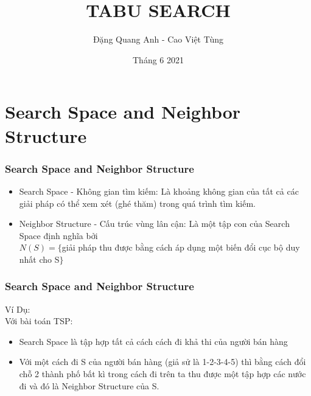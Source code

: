 \documentclass[12pt]{beamer}
\begin{document}
	\author{Đặng Quang Anh - Cao Việt Tùng}
	\title{TABU SEARCH}
	\date{Tháng 6 2021}
	\maketitle
	

	\section{Search Space and Neighbor Structure}
	\begin{frame}
		\frametitle{Search Space and Neighbor Structure}
		\begin{itemize}
			\item Search Space - Không gian tìm kiếm: Là khoảng không gian của tất cả các giải pháp có thể xem xét (ghé thăm) trong quá trình tìm kiếm.
			\item Neighbor Structure - Cấu trúc vùng lân cận: Là một tập con của Search Space định nghĩa bởi\\
					$N(S) = \{ $giải pháp thu được bằng cách áp dụng một biến đổi cục bộ duy nhất cho S$ \}$
		\end{itemize}
	\end{frame}

	\begin{frame}
		\frametitle{Search Space and Neighbor Structure}
		Ví Dụ:\\
		Với bài toán TSP:\\
		\begin{itemize}
			\item Search Space là tập hợp tất cả cách cách đi khả thi của người bán hàng
			\item Với một cách đi S của người bán hàng (giả sử là 1-2-3-4-5) thì bằng cách đổi chỗ 2 thành phố bất kì trong cách đi trên ta thu được một tập hợp các nước đi và đó là Neighbor Structure của S.
		\end{itemize}
	\end{frame}
	
\end{document}
